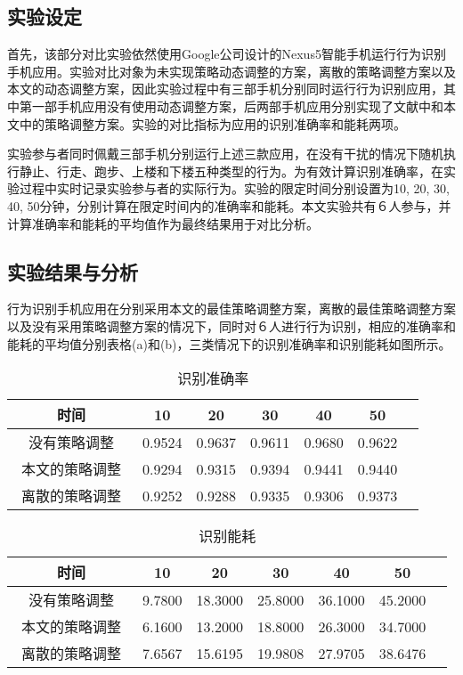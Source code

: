 \subsection{实验设定}
\par 首先，该部分对比实验依然使用Google公司设计的Nexus5智能手机运行行为识别手机应用。实验对比对象为未实现策略动态调整的方案，离散的策略调整方案以及本文的动态调整方案，因此实验过程中有三部手机分别同时运行行为识别应用，其中第一部手机应用没有使用动态调整方案，后两部手机应用分别实现了文献\cite{}中和本文中的策略调整方案。实验的对比指标为应用的识别准确率和能耗两项。
\par 实验参与者同时佩戴三部手机分别运行上述三款应用，在没有干扰的情况下随机执行静止、行走、跑步、上楼和下楼五种类型的行为。为有效计算识别准确率，在实验过程中实时记录实验参与者的实际行为。实验的限定时间分别设置为10, 20, 30, 40, 50分钟，分别计算在限定时间内的准确率和能耗。本文实验共有６人参与，并计算准确率和能耗的平均值作为最终结果用于对比分析。
\subsection{实验结果与分析}
\par 行为识别手机应用在分别采用本文的最佳策略调整方案，离散的最佳策略调整方案\cite{modelVarialb}以及没有采用策略调整方案的情况下，同时对６人进行行为识别，相应的准确率和能耗的平均值分别表格(a)和(b)，三类情况下的识别准确率和识别能耗如图所示。

\begin{table}[htb]
    \centering
    \caption{识别准确率}
    \begin{tabular}{ccccccc}
    \toprule
    时间 & 10 & 20 & 30 & 40 & 50 \\
    \midrule
    没有策略调整 & 0.9524 & 0.9637 & 0.9611 & 0.9680 & 0.9622 \\
    本文的策略调整　& 0.9294 & 0.9315 & 0.9394 & 0.9441 & 0.9440 \\
    离散的策略调整 & 0.9252 & 0.9288 & 0.9335 & 0.9306 & 0.9373 \\
    \bottomrule
    \end{tabular}
\end{table}

\begin{table}[htb]
    \centering
    \caption{识别能耗}
    \begin{tabular}{ccccccc}
    \toprule
    时间 & 10 & 20 & 30 & 40 & 50 \\
    \midrule
    没有策略调整 & 9.7800 & 18.3000 & 25.8000 & 36.1000 & 45.2000 \\
    本文的策略调整　& 6.1600 & 13.2000 & 18.8000 & 26.3000 & 34.7000 \\
    离散的策略调整 & 7.6567 & 15.6195 & 19.9808 & 27.9705 & 38.6476 \\
    \bottomrule
    \end{tabular}
\end{table}

